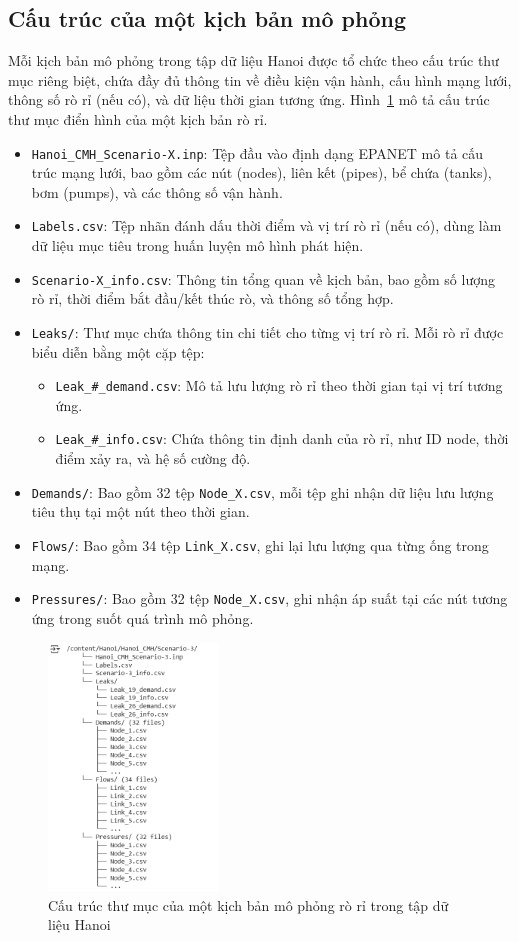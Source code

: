 \subsection{Cấu trúc của một kịch bản mô phỏng}

Mỗi kịch bản mô phỏng trong tập dữ liệu Hanoi được tổ chức theo cấu trúc thư mục riêng biệt, chứa đầy đủ thông tin về điều kiện vận hành, cấu hình mạng lưới, thông số rò rỉ (nếu có), và dữ liệu thời gian tương ứng. Hình~\ref{fig:scenario_structure} mô tả cấu trúc thư mục điển hình của một kịch bản rò rỉ.

\begin{itemize}
    \item \texttt{Hanoi\_CMH\_Scenario-X.inp}: Tệp đầu vào định dạng EPANET mô tả cấu trúc mạng lưới, bao gồm các nút (nodes), liên kết (pipes), bể chứa (tanks), bơm (pumps), và các thông số vận hành.
    \item \texttt{Labels.csv}: Tệp nhãn đánh dấu thời điểm và vị trí rò rỉ (nếu có), dùng làm dữ liệu mục tiêu trong huấn luyện mô hình phát hiện.
    \item \texttt{Scenario-X\_info.csv}: Thông tin tổng quan về kịch bản, bao gồm số lượng rò rỉ, thời điểm bắt đầu/kết thúc rò, và thông số tổng hợp.
    \item \texttt{Leaks/}: Thư mục chứa thông tin chi tiết cho từng vị trí rò rỉ. Mỗi rò rỉ được biểu diễn bằng một cặp tệp:
    \begin{itemize}
        \item \texttt{Leak\_\#\_demand.csv}: Mô tả lưu lượng rò rỉ theo thời gian tại vị trí tương ứng.
        \item \texttt{Leak\_\#\_info.csv}: Chứa thông tin định danh của rò rỉ, như ID node, thời điểm xảy ra, và hệ số cường độ.
    \end{itemize}
    \item \texttt{Demands/}: Bao gồm 32 tệp \texttt{Node\_X.csv}, mỗi tệp ghi nhận dữ liệu lưu lượng tiêu thụ tại một nút theo thời gian.
    \item \texttt{Flows/}: Bao gồm 34 tệp \texttt{Link\_X.csv}, ghi lại lưu lượng qua từng ống trong mạng.
    \item \texttt{Pressures/}: Bao gồm 32 tệp \texttt{Node\_X.csv}, ghi nhận áp suất tại các nút tương ứng trong suốt quá trình mô phỏng.
\end{itemize}

\begin{figure}[!htb]
    \centering
    \includegraphics[width=0.4\textwidth]{image/section5_3/scenario_structure.png}
    \caption{Cấu trúc thư mục của một kịch bản mô phỏng rò rỉ trong tập dữ liệu Hanoi}
    \label{fig:scenario_structure}
\end{figure}
